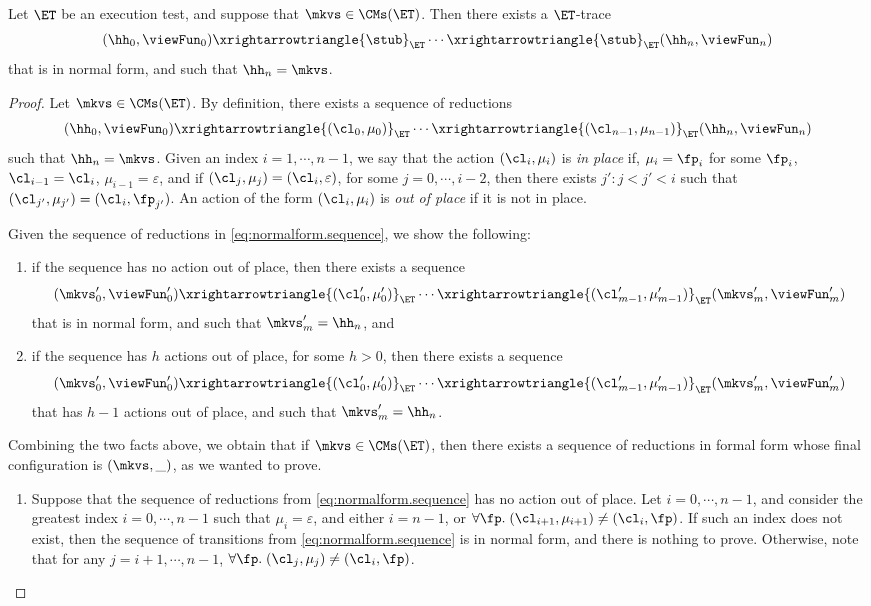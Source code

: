 \begin{proposition}
\label{prop:et.normalform}
Let $\ET$ be an execution test, and suppose that $\mkvs \in \CMs(\ET)$. Then there exists a $\ET$-trace  
\[
(\hh_0, \viewFun_0) \xrightarrowtriangle{\stub}_{\ET} \cdots \xrightarrowtriangle{\stub}_{\ET} (\hh_n, \viewFun_{n})
\]
that is in normal form, and such that $\hh_{n} = \mkvs$.
\end{proposition}
\begin{proof}
Let $\mkvs \in \CMs(\ET)$. By definition, there exists a sequence of reductions 
\begin{equation}
\label{eq:normalform.sequence}
(\hh_{0}, \viewFun_{0}) \xrightarrowtriangle{(\cl_0, \mu_0)}_{\ET} \cdots \xrightarrowtriangle{(\cl_{n-1}, \mu_{n-1})}_{\ET} (\hh_n, \viewFun_{n})
\end{equation}
such that $\hh_{n} = \mkvs$. Given an index $i = 1,\cdots, n-1$, we say that the action $(\cl_{i}, \mu_{i})$ is \emph{in place} 
if, $\mu_{i} = \fp_{i}$ for some $\fp_{i}$, $\cl_{i-1} = \cl_{i}$, $\mu_{i-1} = \varepsilon$, and if $(\cl_{j}, \mu_{j}) = (\cl_{i}, \varepsilon)$, 
for some  $j = 0,\cdots, i-2$, then there exists $j': j < j' < i$ such that $(\cl_{j'}, \mu_{j'}) = (\cl_i, \fp_{j'})$. An action of the 
form $(\cl_{i}, \mu_{i})$ is \emph{out of place} if it is not in place. 

Given the sequence of reductions in \cref{eq:normalform.sequence}, we show the following: 
\begin{enumerate}
\item if the sequence has no action out of place, then there exists a sequence 
\[
(\mkvs'_{0}, \viewFun'_{0}) \xrightarrowtriangle{(\cl'_{0}, \mu'_{0})}_{\ET} \cdots \xrightarrowtriangle{(\cl'_{m-1}, \mu'_{m-1})}_{\ET} (\mkvs'_{m}, \viewFun'_{m})
\]
that is in normal form, and such that $\mkvs'_{m} = \hh_{n}$, and 
\item if the sequence has $h$ actions out of place, for some $h > 0$, then there exists a sequence 
\[
(\mkvs'_{0}, \viewFun'_{0}) \xrightarrowtriangle{(\cl'_{0}, \mu'_{0})}_{\ET} \cdots \xrightarrowtriangle{(\cl'_{m-1}, \mu'_{m-1})}_{\ET} (\mkvs'_{m}, \viewFun'_{m})
\]
that has $h-1$ actions out of place, and such that $\mkvs'_{m} = \hh_{n}$.
\end{enumerate}
Combining the two facts above, we obtain that if $\mkvs \in \CMs(\ET)$, then there exists a sequence of reductions in formal form whose final 
configuration is $(\mkvs, \_)$, as we wanted to prove.

\begin{enumerate}
\item 
Suppose that the sequence of reductions from \cref{eq:normalform.sequence} has no action out of place. 
Let $i=0,\cdots, n-1$, and consider the greatest index $i=0,\cdots, n-1$ such that  
$\mu_{i} = \varepsilon$, and either $i = n-1$, or 
$\forall \fp.\; (\cl_{i+1}, \mu_{i+1}) \neq (\cl_{i}, \fp)$. 
If such an index does not exist, then the sequence of transitions from \cref{eq:normalform.sequence} is in 
normal form, and there is nothing to prove. Otherwise, note that for any $j = i+1,\cdots, n-1$, 
$\forall \fp.\;(\cl_{j}, \mu_{j}) \neq (\cl_{i}, \fp)$. 


\end{enumerate}
\end{proof}
